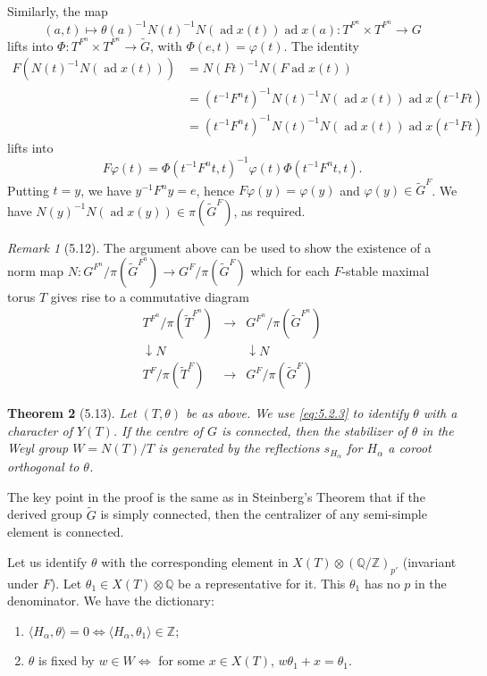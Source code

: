 \documentclass[11pt]{amsart}
\theoremstyle{plain}
\newtheorem{theorem}{Theorem}[section]
\theoremstyle{remark}
\newtheorem{remark}[theorem]{Remark}
\DeclareMathOperator{\ad}{ad}
\begin{document}
Similarly, the map
\[
(a, t) \mapsto \theta(a)^{-1}N(t)^{-1}N(\ad x(t))\ad x(a): T^{F^n} \times T^{F^n} \longrightarrow G
\]
lifts into $\Phi: T^{F^n} \times T^{F^n} \to \tilde{G}$, with $\Phi(e, t) = \varphi(t)$. The identity
\begin{align*}
F(N(t)^{-1}N(\ad x(t))) &= N(Ft)^{-1}N(F\ad x(t)) \\
&= (t^{-1}F^nt)^{-1}N(t)^{-1}N(\ad x(t))\ad x(t^{-1}Ft) \\
&= (t^{-1}F^nt)^{-1}N(t)^{-1}N(\ad x(t))\ad x(t^{-1}Ft)
\end{align*}
lifts into
\[
F\varphi(t) = \Phi(t^{-1}F^nt, t)^{-1}\varphi(t)\Phi(t^{-1}F^nt, t).
\]
Putting $t = y$, we have $y^{-1}F^ny = e$, hence $F\varphi(y) = \varphi(y)$ and $\varphi(y) \in \tilde{G}^F$. We have $N(y)^{-1}N(\ad x(y)) \in \pi(\tilde{G}^F)$, as required.

\begin{remark}[5.12]
The argument above can be used to show the existence of a norm map $N: G^{F^n}/\pi(\tilde{G}^{F^n}) \to G^F/\pi(\tilde{G}^F)$ which for each $F$-stable maximal torus $T$ gives rise to a commutative diagram
\[
\begin{array}{ccc}
T^{F^n}/\pi(\tilde{T}^{F^n}) & \longrightarrow & G^{F^n}/\pi(\tilde{G}^{F^n}) \\
\downarrow{N} & & \downarrow{N} \\
T^F/\pi(\tilde{T}^F) & \longrightarrow & G^F/\pi(\tilde{G}^F)
\end{array}
\]
\end{remark}

\begin{theorem}[5.13]
Let $(T, \theta)$ be as above. We use \eqref{eq:5.2.3} to identify $\theta$ with a character of $Y(T)$. If the centre of $G$ is connected, then the stabilizer of $\theta$ in the Weyl group $W = N(T)/T$ is generated by the reflections $s_{H_\alpha}$ for $H_\alpha$ a coroot orthogonal to $\theta$.
\end{theorem}

The key point in the proof is the same as in Steinberg's Theorem that if the derived group $\tilde{G}$ is simply connected, then the centralizer of any semi-simple element is connected.

Let us identify $\theta$ with the corresponding element in $X(T) \otimes (\mathbb{Q}/\mathbb{Z})_{p'}$ (invariant under $F$). Let $\theta_1 \in X(T) \otimes \mathbb{Q}$ be a representative for it. This $\theta_1$ has no $p$ in the denominator. We have the dictionary:
\begin{enumerate}
\item[(a)] $\langle H_\alpha, \theta \rangle = 0 \iff \langle H_\alpha, \theta_1 \rangle \in \mathbb{Z}$;
\item[(b)] $\theta$ is fixed by $w \in W \iff$ for some $x \in X(T)$, $w\theta_1 + x = \theta_1$.
\end{enumerate}
\end{document}
